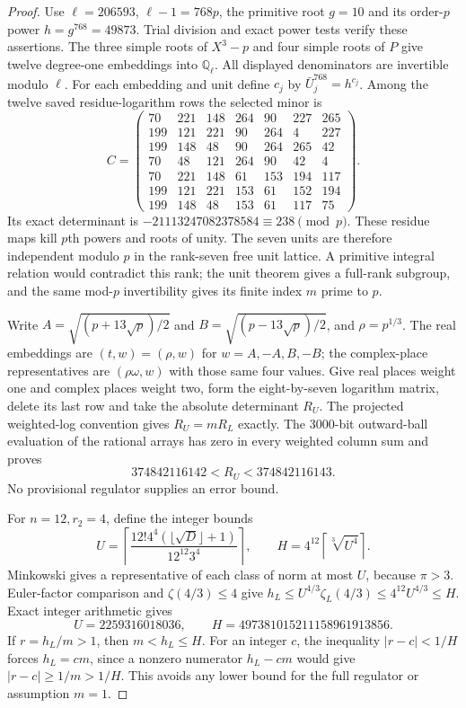 \begin{proof}
Use $\ell=206593$, $\ell-1=768p$, the primitive root $g=10$
and its order-$p$ power $h=g^{768}=49873$.
Trial division and exact power tests verify these assertions.
The three simple roots of $X^3-p$ and four simple roots of $P$
give twelve degree-one embeddings into $\mathbb Q_\ell$.
All displayed denominators are invertible modulo $\ell$.
For each embedding and unit define $c_j$ by
$\bar U_j^{768}=h^{c_j}$.
Among the twelve saved residue-logarithm rows the selected minor is
\[
 C=\begin{pmatrix}
70&221&148&264&90&227&265\\
199&121&221&90&264&4&227\\
199&148&48&90&264&265&42\\
70&48&121&264&90&42&4\\
70&221&148&61&153&194&117\\
199&121&221&153&61&152&194\\
199&148&48&153&61&117&75
\end{pmatrix}.
 \tag{G152C.12}
\]
Its exact determinant is
$-21113247082378584\equiv238\pmod p$.
These residue maps kill $p$th powers and roots of unity.
The seven units are therefore independent modulo $p$ in the
rank-seven free unit lattice.
A primitive integral relation would contradict this rank;
the unit theorem gives a full-rank subgroup, and the same
mod-$p$ invertibility gives its finite index $m$ prime to $p$.

Write $A=\sqrt{(p+13\sqrt p)/2}$ and
$B=\sqrt{(p-13\sqrt p)/2}$, and $\rho=p^{1/3}$.
The real embeddings are $(t,w)=(\rho,w)$ for $w=A,-A,B,-B$;
the complex-place representatives are $(\rho\omega,w)$
with those same four values.
Give real places weight one and complex places weight two,
form the eight-by-seven logarithm matrix, delete its last row
and take the absolute determinant $R_U$.
The projected weighted-log convention gives $R_U=mR_L$ exactly.
The $3000$-bit outward-ball evaluation of the rational arrays
has zero in every weighted column sum and proves
\[
                        374842116142<R_U<374842116143.
 \tag{G152C.13}
\]
No provisional regulator supplies an error bound.

For $n=12,r_2=4$, define the integer bounds
\[
 U=\left\lceil\frac{12!4^4(\lfloor\sqrt D\rfloor+1)}
                              {12^{12}3^4}\right\rceil,
 \qquad H=4^{12}\left\lceil\sqrt[3]{U^4}\right\rceil.
 \tag{G152C.14}
\]
Minkowski gives a representative of each class of norm at most
$U$, because $\pi>3$.
Euler-factor comparison and $\zeta(4/3)\le4$ give
$h_L\le U^{4/3}\zeta_L(4/3)\le4^{12}U^{4/3}\le H$.
Exact integer arithmetic gives
\[
                  U=2259316018036,
           \qquad H=497381015211158961913856.
 \tag{G152C.15}
\]
If $r=h_L/m>1$, then $m<h_L\le H$.
For an integer $c$, the inequality $|r-c|<1/H$ forces
$h_L=cm$, since a nonzero numerator $h_L-cm$ would give
$|r-c|\ge1/m>1/H$.
This avoids any lower bound for the full regulator or assumption $m=1$.


\end{proof}
